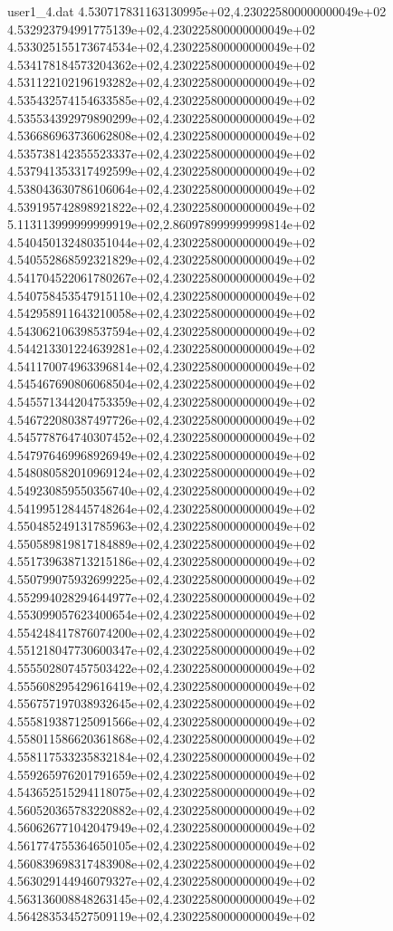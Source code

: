 \begin{filecontents}{user1_4.dat}
4.530717831163130995e+02,4.230225800000000049e+02
4.532923794991775139e+02,4.230225800000000049e+02
4.533025155173674534e+02,4.230225800000000049e+02
4.534178184573204362e+02,4.230225800000000049e+02
4.531122102196193282e+02,4.230225800000000049e+02
4.535432574154633585e+02,4.230225800000000049e+02
4.535534392979890299e+02,4.230225800000000049e+02
4.536686963736062808e+02,4.230225800000000049e+02
4.535738142355523337e+02,4.230225800000000049e+02
4.537941353317492599e+02,4.230225800000000049e+02
4.538043630786106064e+02,4.230225800000000049e+02
4.539195742898921822e+02,4.230225800000000049e+02
5.113113999999999919e+02,2.860978999999999814e+02
4.540450132480351044e+02,4.230225800000000049e+02
4.540552868592321829e+02,4.230225800000000049e+02
4.541704522061780267e+02,4.230225800000000049e+02
4.540758453547915110e+02,4.230225800000000049e+02
4.542958911643210058e+02,4.230225800000000049e+02
4.543062106398537594e+02,4.230225800000000049e+02
4.544213301224639281e+02,4.230225800000000049e+02
4.541170074963396814e+02,4.230225800000000049e+02
4.545467690806068504e+02,4.230225800000000049e+02
4.545571344204753359e+02,4.230225800000000049e+02
4.546722080387497726e+02,4.230225800000000049e+02
4.545778764740307452e+02,4.230225800000000049e+02
4.547976469968926949e+02,4.230225800000000049e+02
4.548080582010969124e+02,4.230225800000000049e+02
4.549230859550356740e+02,4.230225800000000049e+02
4.541995128445748264e+02,4.230225800000000049e+02
4.550485249131785963e+02,4.230225800000000049e+02
4.550589819817184889e+02,4.230225800000000049e+02
4.551739638713215186e+02,4.230225800000000049e+02
4.550799075932699225e+02,4.230225800000000049e+02
4.552994028294644977e+02,4.230225800000000049e+02
4.553099057623400654e+02,4.230225800000000049e+02
4.554248417876074200e+02,4.230225800000000049e+02
4.551218047730600347e+02,4.230225800000000049e+02
4.555502807457503422e+02,4.230225800000000049e+02
4.555608295429616419e+02,4.230225800000000049e+02
4.556757197038932645e+02,4.230225800000000049e+02
4.555819387125091566e+02,4.230225800000000049e+02
4.558011586620361868e+02,4.230225800000000049e+02
4.558117533235832184e+02,4.230225800000000049e+02
4.559265976201791659e+02,4.230225800000000049e+02
4.543652515294118075e+02,4.230225800000000049e+02
4.560520365783220882e+02,4.230225800000000049e+02
4.560626771042047949e+02,4.230225800000000049e+02
4.561774755364650105e+02,4.230225800000000049e+02
4.560839698317483908e+02,4.230225800000000049e+02
4.563029144946079327e+02,4.230225800000000049e+02
4.563136008848263145e+02,4.230225800000000049e+02
4.564283534527509119e+02,4.230225800000000049e+02

\end{filecontents}
